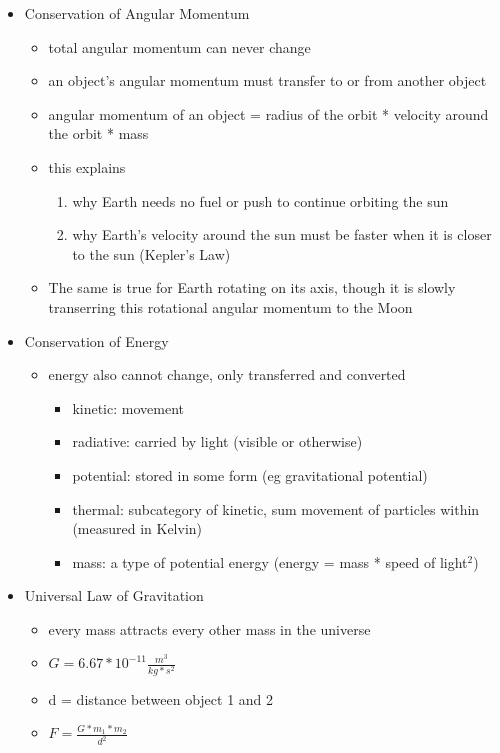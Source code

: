 \documentclass[12pt]{article}
\begin{document}
\begin{itemize}
\item Conservation of Angular Momentum
\begin{itemize}
\item total angular momentum can never change
\item an object's angular momentum must transfer to or from another object
\item angular momentum of an object = radius of the orbit * velocity around the orbit * mass
\item this explains
\begin{enumerate}
\item why Earth needs no fuel or push to continue orbiting the sun
\item why Earth's velocity around the sun must be faster when it is closer to the sun (Kepler's Law)
\end{enumerate}
\item The same is true for Earth rotating on its axis, though it is slowly transerring this rotational angular momentum to the Moon
\end{itemize}
\item Conservation of Energy
\begin{itemize}
\item energy also cannot change, only transferred and converted
\begin{itemize}
\item kinetic: movement
\item radiative: carried by light (visible or otherwise)
\item potential: stored in some form (eg gravitational potential)
\item thermal: subcategory of kinetic, sum movement of particles within (measured in Kelvin)
\item mass: a type of potential energy  (energy = mass * speed of light$^2$)
\end{itemize}
\end{itemize}
\item Universal Law of Gravitation
\begin{itemize}
\item every mass attracts every other mass in the universe
\item $G = 6.67*10^{-11} \frac{m^3}{kg*s^2}$
\item d = distance between object 1 and 2
\item $F = \frac{G*m_1*m_2}{d^2}$
\end{itemize}
\end{itemize}
\end{document}
